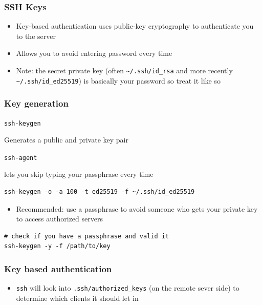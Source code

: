 \documentclass[letterpaper,12pt]{article}
\newcommand*{\lstitem}[1]{
  \setbox0\hbox{\lstinline{#1}}
  \item[\usebox0]
}
\begin{document}
\subsubsection{SSH Keys}

\begin{itemize}
 \item Key-based authentication uses public-key cryptography to authenticate you to the server
 \item Allows you to avoid entering password every time
 \item Note: the secret private key (often \lstinline{~/.ssh/id_rsa} and more recently \lstinline{~/.ssh/id_ed25519}) is basically your password so treat it like so
\end{itemize}

\subsubsection{Key generation}

\begin{description}
 \lstitem{ssh-keygen} Generates a public and private key pair
 \lstitem{ssh-agent} lets you skip typing your passphrase every time
\end{description}

\begin{lstlisting}
ssh-keygen -o -a 100 -t ed25519 -f ~/.ssh/id_ed25519
\end{lstlisting}

\begin{itemize}
 \item Recommended: use a passphrase to avoid someone who gets your private key to access authorized servers
\end{itemize}

\begin{lstlisting}
# check if you have a passphrase and valid it
ssh-keygen -y -f /path/to/key
\end{lstlisting}

\subsubsection{Key based authentication}
\begin{itemize}
 \item \lstinline{ssh} will look into \lstinline{.ssh/authorized_keys} (on the remote sever side) to determine which clients it should let in
\end{itemize}
\end{document}

